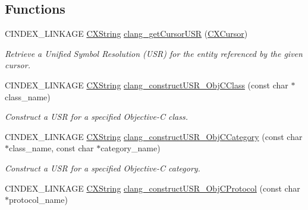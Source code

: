 \subsection*{Functions}
\begin{DoxyCompactItemize}
\item 
C\+I\+N\+D\+E\+X\+\_\+\+L\+I\+N\+K\+A\+GE \hyperlink{structCXString}{C\+X\+String} \hyperlink{group__CINDEX__CURSOR__XREF_ga51679cb755bbd94cc5e9476c685f2df3}{clang\+\_\+get\+Cursor\+U\+SR} (\hyperlink{structCXCursor}{C\+X\+Cursor})
\begin{DoxyCompactList}\small\item\em Retrieve a Unified Symbol Resolution (U\+SR) for the entity referenced by the given cursor. \end{DoxyCompactList}\item 
\mbox{\label{group__CINDEX__CURSOR__XREF_ga1ca1d94cdcb4d435c5e2e02d888b8e98}} 
C\+I\+N\+D\+E\+X\+\_\+\+L\+I\+N\+K\+A\+GE \hyperlink{structCXString}{C\+X\+String} \hyperlink{group__CINDEX__CURSOR__XREF_ga1ca1d94cdcb4d435c5e2e02d888b8e98}{clang\+\_\+construct\+U\+S\+R\+\_\+\+Obj\+C\+Class} (const char $\ast$class\+\_\+name)
\begin{DoxyCompactList}\small\item\em Construct a U\+SR for a specified Objective-\/C class. \end{DoxyCompactList}\item 
\mbox{\label{group__CINDEX__CURSOR__XREF_gabeb36e25f86fc061c0367145fab6e291}} 
C\+I\+N\+D\+E\+X\+\_\+\+L\+I\+N\+K\+A\+GE \hyperlink{structCXString}{C\+X\+String} \hyperlink{group__CINDEX__CURSOR__XREF_gabeb36e25f86fc061c0367145fab6e291}{clang\+\_\+construct\+U\+S\+R\+\_\+\+Obj\+C\+Category} (const char $\ast$class\+\_\+name, const char $\ast$category\+\_\+name)
\begin{DoxyCompactList}\small\item\em Construct a U\+SR for a specified Objective-\/C category. \end{DoxyCompactList}\item 
\mbox{\label{group__CINDEX__CURSOR__XREF_ga69236bf8ac3dadbb553ab6db463ad3d0}} 
C\+I\+N\+D\+E\+X\+\_\+\+L\+I\+N\+K\+A\+GE \hyperlink{structCXString}{C\+X\+String} \hyperlink{group__CINDEX__CURSOR__XREF_ga69236bf8ac3dadbb553ab6db463ad3d0}{clang\+\_\+construct\+U\+S\+R\+\_\+\+Obj\+C\+Protocol} (const char $\ast$protocol\+\_\+name)

\end{DoxyCompactItemize}
